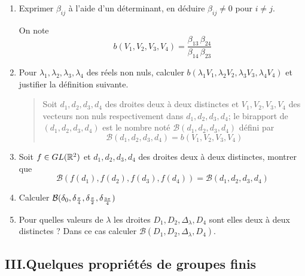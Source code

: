 \begin{enumerate}
\item  Exprimer $\beta _{ij}$ {\`a} l'aide d'un d{\'e}terminant, en
d{\'e}duire $\beta _{ij}\neq 0$ pour $i\neq j$.

On note
\[
b(V_{1},V_{2},V_{3},V_{4})=\frac{\beta _{13}\,\beta _{24}}{\beta
_{14}\,\beta _{23}}
\]

\item  Pour $\lambda _{1},\lambda _{2},\lambda _{3},\lambda _{4}$ des
r{\'e}els non nuls, calculer $b(\lambda _{1}V_{1},\lambda _{2}V_{2},\lambda
_{3}V_{3},\lambda _{4}V_{4})$ et justifier la d{\'e}finition suivante.

\begin{quote}
Soit $d_{1},d_{2},d_{3},d_{4}$ des droites deux {\`a} deux distinctes et $V_{1},V_{2},V_{3},V_{4}$ des vecteurs non nuls respectivement dans $d_{1},d_{2},d_{3},d_{4}$;\newline
le birapport de $(d_{1},d_{2},d_{3},d_{4})$ est le nombre not{\'e} $\mathcal{B}(d_{1},d_{2},d_{3},d_{4})$ d{\'e}fini par
\begin{displaymath}
 \mathcal{B}(d_{1},d_{2},d_{3},d_{4})=b(V_{1},V_{2},V_{3},V_{4})
\end{displaymath}
\end{quote}


\item  Soit $f\in GL(\mathbb{R}^{2})$ et $d_{1},d_{2},d_{3},d_{4}$ des
droites deux {\`a} deux distinctes, montrer que
\[
\mathcal{B}(f(d_{1}),f(d_{2}),f(d_{3}),f(d_{4}))=\mathcal{B}%
(d_{1},d_{2},d_{3},d_{4})
\]

\item  Calculer $\mathcal{B}(\delta _{0},\delta _{\frac{\pi }{4}},\delta _{%
\frac{\pi }{2}},\delta _{\frac{3\pi }{4}})$

\item  Pour quelles valeurs de $\lambda $ les droites $D_{1},D_{2},\Delta
_{\lambda },D_{4}$ sont elles deux {\`a} deux distinctes ? Dans ce cas
calculer $\mathcal{B}(D_{1},D_{2},\Delta _{\lambda },D_{4})$.
\end{enumerate}

\subsection*{III.\qquad Quelques propri{\'e}t{\'e}s de groupes finis}

